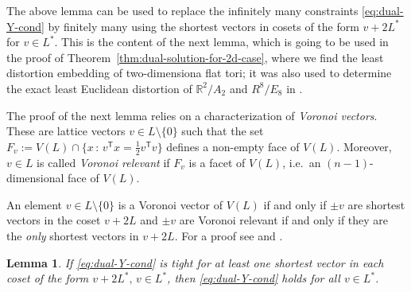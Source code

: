 \documentclass{amsart}
\newtheorem{lemma}[defin]{Lemma}
\newcommand{\R}{\mathbb{R}}
\begin{document}
The above lemma can be used to replace the infinitely many constraints
\eqref{eq:dual-Y-cond} by finitely many using the shortest vectors in
cosets of the form $ v+2L^* $ for $ v \in L^* $. This is the content of the next lemma, which is going to be used in the proof of Theorem~\ref{thm:dual-solution-for-2d-case}, where we find the least distortion embedding of two-dimensiona flat tori; it was also used
to determine the exact least Euclidean distortion of $\R^2 / A_2$ and $R^8 / E_8$ in \cite{Moustrou2023a}.

The proof of the next lemma relies on a characterization of \emph{Voronoi
vectors}. These are lattice vectors $ v \in L\setminus\{0\}  $ such that the set $  F_v :=V(L) \cap \{x \, : \, v^\mathsf{T}x = \frac{1}{2}
v^\mathsf{T}v \}$ defines a non-empty face of $ V(L)$. Moreover, $ v \in L $ is called \emph{Voronoi relevant} if $ F_v $ is a facet of $ V(L) $, i.e.\ an $ (n-1) $-dimensional face of $ V(L) $.

An element $ v \in L\setminus\{0\} $ is a Voronoi vector of $ V(L)$ if and
only if $ \pm v$ are shortest vectors in the coset $ v+2L$ and
$ \pm v$ are Voronoi relevant if and only if they are the \emph{only}
shortest vectors in $ v+2L$. For a proof see \cite[Chapter 21, Theorem
10]{Conway1988a} and \cite[Theorem 2]{Conway1992}.

\begin{lemma}
  \label{lem:equality-for-Vor-rel-vecs}
  If \eqref{eq:dual-Y-cond} is tight for at least one shortest vector
  in each coset of the form $ v+2L^*, \, v \in L^*$, then
  \eqref{eq:dual-Y-cond} holds for all $ v \in L^*$.
\end{lemma}
\end{document}
